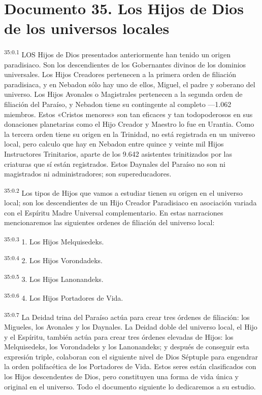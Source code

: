 \chapter{Documento 35. Los Hijos de Dios de los universos locales}
\par
\textsuperscript{35:0.1} LOS Hijos de Dios presentados anteriormente han tenido un origen paradisiaco. Son los descendientes de los Gobernantes divinos de los dominios universales. Los Hijos Creadores pertenecen a la primera orden de filiación paradisiaca, y en Nebadon sólo hay uno de ellos, Miguel, el padre y soberano del universo. Los Hijos Avonales o Magistrales pertenecen a la segunda orden de filiación del Paraíso, y Nebadon tiene su contingente al completo ---1.062 miembros. Estos «Cristos menores» son tan eficaces y tan todopoderosos en sus donaciones planetarias como el Hijo Creador y Maestro lo fue en Urantia. Como la tercera orden tiene su origen en la Trinidad, no está registrada en un universo local, pero calculo que hay en Nebadon entre quince y veinte mil Hijos Instructores Trinitarios, aparte de los 9.642 asistentes trinitizados por las criaturas que sí están registrados. Estos Daynales del Paraíso no son ni magistrados ni administradores; son supereducadores.

\par
\textsuperscript{35:0.2} Los tipos de Hijos que vamos a estudiar tienen su origen en el universo local; son los descendientes de un Hijo Creador Paradisiaco en asociación variada con el Espíritu Madre Universal complementario. En estas narraciones mencionaremos las siguientes ordenes de filiación del universo local:

\par
\textsuperscript{35:0.3} 1. Los Hijos Melquisedeks.

\par
\textsuperscript{35:0.4} 2. Los Hijos Vorondadeks.

\par
\textsuperscript{35:0.5} 3. Los Hijos Lanonandeks.

\par
\textsuperscript{35:0.6} 4. Los Hijos Portadores de Vida.

\par
\textsuperscript{35:0.7} La Deidad trina del Paraíso actúa para crear tres órdenes de filiación: los Migueles, los Avonales y los Daynales. La Deidad doble del universo local, el Hijo y el Espíritu, también actúa para crear tres órdenes elevadas de Hijos: los Melquisedeks, los Vorondadeks y los Lanonandeks; y después de conseguir esta expresión triple, colaboran con el siguiente nivel de Dios Séptuple para engendrar la orden polifacética de los Portadores de Vida. Estos seres están clasificados con los Hijos descendentes de Dios, pero constituyen una forma de vida única y original en el universo. Todo el documento siguiente lo dedicaremos a su estudio.

